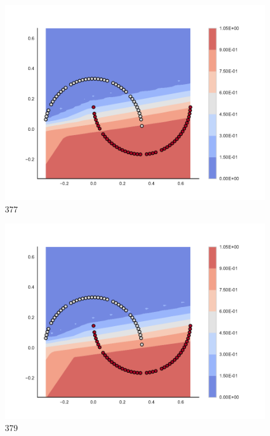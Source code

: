 \begin{subfigure}[b]{0.09\textwidth}
    \includegraphics[clip, trim=2.35cm 1.75cm 4.5cm 0cm,width=\textwidth]{img/convergence/377.pdf}
    \caption{377}
    \label{fig:convergence_377}
\end{subfigure}
%
\begin{subfigure}[b]{0.09\textwidth}
    \includegraphics[clip, trim=2.35cm 1.75cm 4.5cm 0cm,width=\textwidth]{img/convergence/379.pdf}
    \caption{379}
    \label{fig:convergence_379}
\end{subfigure}
%
